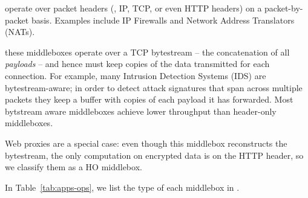  operate over packet headers (\eg{}, IP, TCP, or even HTTP headers) on a packet-by-packet basis.
Examples  include IP Firewalls and Network Address Translators (NATs). 

 these middleboxes operate over a TCP bytestream -- the concatenation of all {\it payloads} -- and hence must keep copies of the data transmitted for each connection.
  For example, many Intrusion Detection Systems (IDS) are bytestream-aware; in order to detect attack signatures that span across multiple packets they keep a buffer  with copies of each payload it has forwarded.
Most bytstream aware middleboxes achieve lower throughput than header-only middleboxes.

 Web proxies are a special case: even though this middlebox reconstructs the bytestream, the only computation on encrypted data is on the HTTP header, so we classify them as a HO middlebox. 
 
 
  
 
 

 
 
  In Table~\ref{tab:apps-ops}, we list the type of each  middlebox in \sys. 
  
